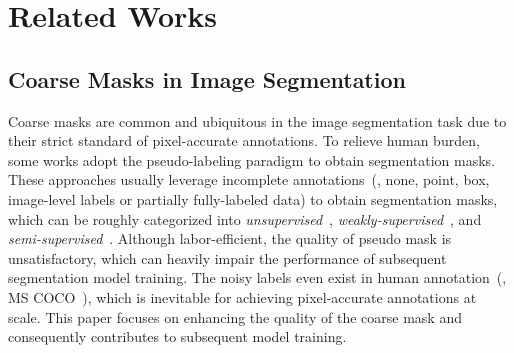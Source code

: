 \section{Related Works}
\subsection{Coarse Masks in Image Segmentation}
Coarse masks are common and ubiquitous in the image segmentation task due to their strict standard of pixel-accurate annotations. To relieve human burden, some works adopt the pseudo-labeling paradigm to obtain segmentation masks. These approaches usually leverage incomplete annotations~(\eg, none, point, box, image-level labels or partially fully-labeled data) to obtain segmentation masks, which can be roughly categorized into \textit{unsupervised}~\cite{cho2021picie,ziegler2022leopart,ke2022hsg, hwang2019segsort,van2021maskcontrast,zhou2022maskclip,shinreco,shin2023namedmask}, \textit{weakly-supervised}~\cite{Lin2016ScribbleSupSC,Dai2015BoxSupEB,Papandreou2015WeaklyandSL,Ahn2018PSA,Xie_2022_CLIMS, Wang2020SEAM,xu2022mctformer}, and \textit{semi-supervised}~\cite{wang2022noisyboundary,filipiak2022politetearcher,yang2023unimatch,xu2022pcr}. Although labor-efficient, the quality of pseudo mask is unsatisfactory, which can heavily impair the performance of subsequent segmentation model training. The noisy labels even exist in human annotation~(\eg, MS COCO~\cite{lin2014microsoftcoco}), which is inevitable for achieving pixel-accurate annotations at scale. This paper focuses on enhancing the quality of the coarse mask and consequently contributes to subsequent model training.


